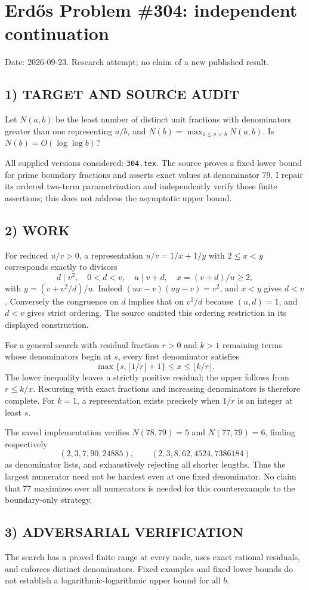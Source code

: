\section{Erd\H{o}s Problem \#304: independent continuation}
\noindent Date: 2026-09-23. Research attempt; no claim of a new published result.
\subsection{1) TARGET AND SOURCE AUDIT}
Let $N(a,b)$ be the least number of distinct unit fractions with denominators greater than one representing $a/b$, and $N(b)=\max_{1\le a<b}N(a,b)$. Is $N(b)=O(\log\log b)$?

All supplied versions considered: \texttt{304.tex}.
The source proves a fixed lower bound for prime boundary fractions and asserts exact values at denominator 79. I repair its ordered two-term parametrization and independently verify those finite assertions; this does not address the asymptotic upper bound.
\subsection{2) WORK}
For reduced $u/v>0$, a representation $u/v=1/x+1/y$ with $2\le x<y$ corresponds exactly to divisors
\[
d\mid v^2,\quad 0<d<v,\quad u\mid v+d,\quad x=(v+d)/u\ge2,
\]
with $y=(v+v^2/d)/u$. Indeed $(ux-v)(uy-v)=v^2$, and $x<y$ gives $d<v$. Conversely the congruence on $d$ implies that on $v^2/d$ because $(u,d)=1$, and $d<v$ gives strict ordering. The source omitted this ordering restriction in its displayed construction.

For a general search with residual fraction $r>0$ and $k>1$ remaining terms whose denominators begin at $s$, every first denominator satisfies
\[
\max\{s,\lfloor1/r\rfloor+1\}\le x\le\lfloor k/r\rfloor.
\]
The lower inequality leaves a strictly positive residual; the upper follows from $r\le k/x$. Recursing with exact fractions and increasing denominators is therefore complete. For $k=1$, a representation exists precisely when $1/r$ is an integer at least $s$.

The saved implementation verifies $N(78,79)=5$ and $N(77,79)=6$, finding respectively
\[
(2,3,7,90,24885),\qquad(2,3,8,62,4524,7386184)
\]
as denominator lists, and exhaustively rejecting all shorter lengths. Thus the largest numerator need not be hardest even at one fixed denominator. No claim that 77 maximizes over all numerators is needed for this counterexample to the boundary-only strategy.
\subsection{3) ADVERSARIAL VERIFICATION}
The search has a proved finite range at every node, uses exact rational residuals, and enforces distinct denominators. Fixed examples and fixed lower bounds do not establish a logarithmic-logarithmic upper bound for all $b$.
